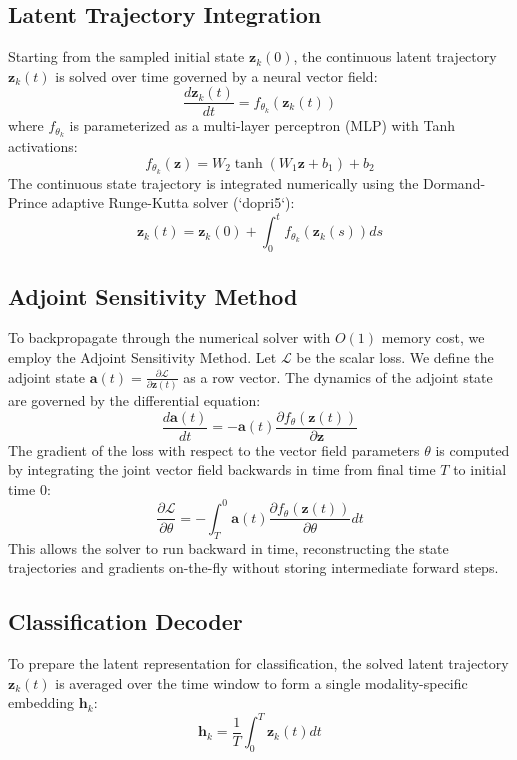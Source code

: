 \documentclass[12pt, a4paper]{report}
\numberwithin{equation}{chapter}
\begin{document}
\subsection{Latent Trajectory Integration}
Starting from the sampled initial state $\mathbf{z}_k(0)$, the continuous latent trajectory $\mathbf{z}_k(t)$ is solved over time governed by a neural vector field:
\begin{equation}
\frac{d\mathbf{z}_k(t)}{dt} = f_{\theta_k}(\mathbf{z}_k(t))
\end{equation}
where $f_{\theta_k}$ is parameterized as a multi-layer perceptron (MLP) with Tanh activations:
\begin{equation}
f_{\theta_k}(\mathbf{z}) = W_2 \tanh(W_1 \mathbf{z} + b_1) + b_2
\end{equation}
The continuous state trajectory is integrated numerically using the Dormand-Prince adaptive Runge-Kutta solver (`dopri5`):
\begin{equation}
\mathbf{z}_k(t) = \mathbf{z}_k(0) + \int_{0}^t f_{\theta_k}(\mathbf{z}_k(s)) ds
\end{equation}

\subsection{Adjoint Sensitivity Method}
To backpropagate through the numerical solver with $O(1)$ memory cost, we employ the Adjoint Sensitivity Method. Let $\mathcal{L}$ be the scalar loss. We define the adjoint state $\mathbf{a}(t) = \frac{\partial \mathcal{L}}{\partial \mathbf{z}(t)}$ as a row vector. The dynamics of the adjoint state are governed by the differential equation:
\begin{equation}
\frac{d\mathbf{a}(t)}{dt} = -\mathbf{a}(t) \frac{\partial f_{\theta}(\mathbf{z}(t))}{\partial \mathbf{z}}
\end{equation}
The gradient of the loss with respect to the vector field parameters $\theta$ is computed by integrating the joint vector field backwards in time from final time $T$ to initial time $0$:
\begin{equation}
\frac{\partial \mathcal{L}}{\partial \theta} = -\int_{T}^{0} \mathbf{a}(t) \frac{\partial f_{\theta}(\mathbf{z}(t))}{\partial \theta} dt
\end{equation}
This allows the solver to run backward in time, reconstructing the state trajectories and gradients on-the-fly without storing intermediate forward steps.

\subsection{Classification Decoder}
To prepare the latent representation for classification, the solved latent trajectory $\mathbf{z}_k(t)$ is averaged over the time window to form a single modality-specific embedding $\mathbf{h}_k$:
\begin{equation}
\mathbf{h}_k = \frac{1}{T} \int_{0}^T \mathbf{z}_k(t) dt
\end{equation}
\end{document}
